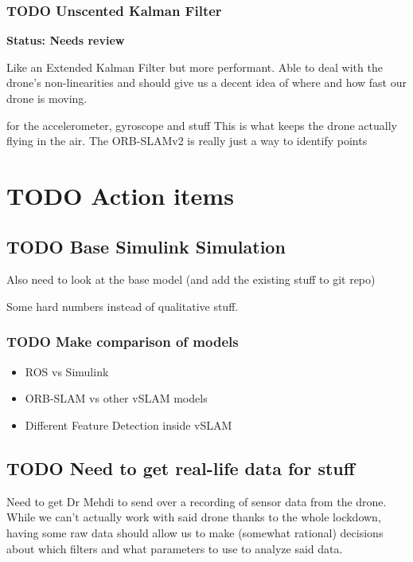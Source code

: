 \documentclass[unrestricted]{meetingnotesminutes}
\begin{document}
\subsubsection{{\bfseries\sffamily TODO} Unscented Kalman Filter}
\label{sec:org0da9042}

\textbf{Status: Needs review}

Like an Extended Kalman Filter but more performant.
Able to deal with the drone's non-linearities and should give us a decent idea of where and how fast our drone is moving.

for the accelerometer, gyroscope and stuff
This is what keeps the drone actually flying in the air.
The ORB-SLAMv2 is really just a way to identify points

\section{{\bfseries\sffamily TODO} Action items}
\label{sec:orgc3818eb}

\subsection{{\bfseries\sffamily TODO} Base Simulink Simulation}
\label{sec:org1143c54}
Also need to look at the base model (and add the existing stuff to git repo)

Some hard numbers instead of qualitative stuff.

\subsubsection{{\bfseries\sffamily TODO} Make comparison of models}
\label{sec:org94cee3f}

\begin{itemize}
\item ROS vs Simulink
\item ORB-SLAM vs other vSLAM models
\item Different Feature Detection inside vSLAM
\end{itemize}

\subsection{{\bfseries\sffamily TODO} Need to get real-life data for stuff}
\label{sec:orgd15efa7}

Need to get Dr Mehdi to send over a recording of sensor data from the drone. While we can't actually work with said drone thanks to the whole lockdown, having some raw data should allow us to make (somewhat rational) decisions about which filters and what parameters to use to analyze said data.
\end{document}

